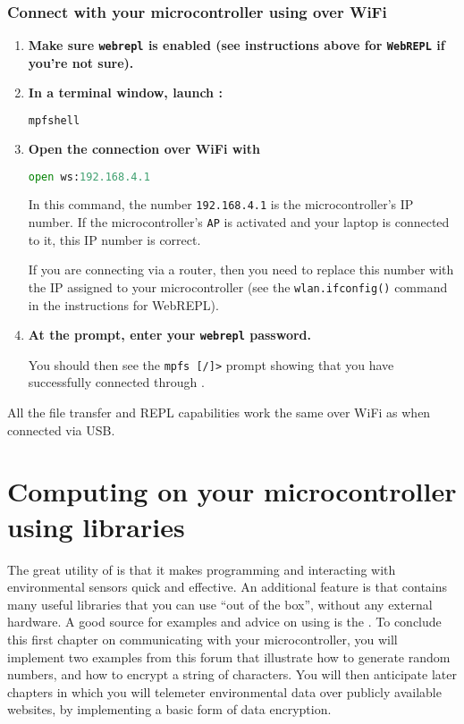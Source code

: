 \subsubsection{\howto Connect with your microcontroller using \mpfshell over WiFi}
\begin{enumerate}
	\item \textbf{Make sure \texttt{webrepl} is enabled (see instructions above for \texttt{WebREPL} if you're not sure).}
	\item \textbf{In a terminal window, launch \mpfshell:}
\begin{lstlisting}[language=Python]
mpfshell
\end{lstlisting}
	\item \textbf{Open the connection over WiFi with}	
\begin{lstlisting}[language=Python]
open ws:192.168.4.1
\end{lstlisting}

	In this command, the number \texttt{192.168.4.1} is the microcontroller's IP number. 
	If the microcontroller's \texttt{AP} is activated and your laptop is connected to it, this IP number is correct.
	
	If you are connecting via a router, then you need to replace this number with the IP assigned to your microcontroller (see the \texttt{wlan.ifconfig()} command in the instructions for WebREPL).
	
	\item \textbf{At the prompt, enter your \texttt{webrepl} password.}
	
	You should then see the \verb|mpfs [/]>| prompt showing that you have successfully connected through \mpfshell.
\end{enumerate}

All the \mpfshell file transfer and REPL capabilities work the same over WiFi as when connected via USB.



\section{Computing on your microcontroller using \Micropython libraries}
The great utility of \Micropython is that it makes programming and interacting with environmental sensors quick and effective. 
An additional feature is that \Micropython contains many useful libraries that you can use ``out of the box'', without any external hardware.
A good source for examples and advice on using \Micropython is the .
To conclude this first chapter on communicating with your microcontroller, you will implement two examples from this forum that illustrate how to generate random numbers, and how to encrypt a string of characters.
You will then anticipate later chapters in which you will telemeter environmental data over publicly available websites, by implementing a basic form of data encryption.  

